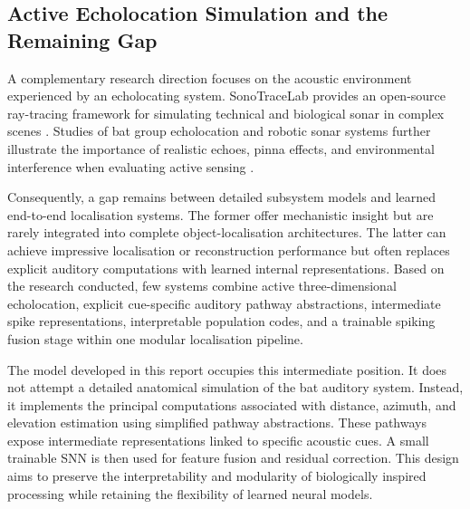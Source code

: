 \subsection{Active Echolocation Simulation and the Remaining Gap}

A complementary research direction focuses on the acoustic environment experienced by an echolocating system. SonoTraceLab provides an open-source ray-tracing framework for simulating technical and biological sonar in complex scenes \cite{Jansen2024SonoTraceLabBats}. Studies of bat group echolocation and robotic sonar systems further illustrate the importance of realistic echoes, pinna effects, and environmental interference when evaluating active sensing \cite{Mazar2026Agent-basedEmergences,Schillebeeckx2011BiomimeticPinnae}.

Consequently, a gap remains between detailed subsystem models and learned end-to-end localisation systems. The former offer mechanistic insight but are rarely integrated into complete object-localisation architectures. The latter can achieve impressive localisation or reconstruction performance but often replaces explicit auditory computations with learned internal representations. Based on the research conducted, few systems combine active three-dimensional echolocation, explicit cue-specific auditory pathway abstractions, intermediate spike representations, interpretable population codes, and a trainable spiking fusion stage within one modular localisation pipeline.

The model developed in this report occupies this intermediate position. It does not attempt a detailed anatomical simulation of the bat auditory system. Instead, it implements the principal computations associated with distance, azimuth, and elevation estimation using simplified pathway abstractions. These pathways expose intermediate representations linked to specific acoustic cues. A small trainable SNN is then used for feature fusion and residual correction. This design aims to preserve the interpretability and modularity of biologically inspired processing while retaining the flexibility of learned neural models.
